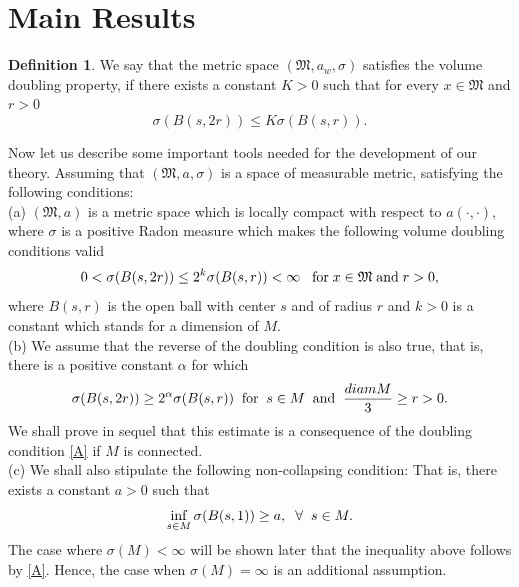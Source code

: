 \documentclass[10pt]{article}
\theoremstyle{definition}
\newtheorem{defx}[thm]{Definition}
\numberwithin{equation}{section}
\begin{document}
	\section{Main Results}
	\begin{defx}
		We say that the metric space $(\mathfrak{M},a_w,\sigma)$ satisfies the volume doubling property, if there exists a constant $K>0$ such that for every $x\in \mathfrak{M}$ and $r>0$ $$\sigma(B(s,2r))\leq K\sigma(B(s,r)).$$
	\end{defx}
	\noindent
	Now let us describe some important tools needed for the development of our theory. Assuming that $(\mathfrak{M},a,\sigma)$ is a space of measurable metric, satisfying the following conditions:\\
	(a) $ (\mathfrak{M},a) $ is a metric space which is locally compact with respect to $ a(\cdotp, \cdotp),$  where $\sigma$ is a positive Radon measure which makes the following volume doubling conditions valid\\
	\begin{equation}\label{A}
		0 < \sigma (B(s,2r)) \leq 2^k \sigma (B(s,r)) < \infty \hspace{0.2 cm}\;\mbox{for}\; x \in \mathfrak{M}\;  \mbox{and}\;  r >0,
	\end{equation}
	where $B(s,r)$ is the open ball with center $s$ and of radius $r$ and $k >0$ is a constant which stands for a dimension of $M$.\\
	(b) We assume that the reverse of the doubling condition is also true, that is, there is a positive constant $ \alpha$ for which
	\begin{equation}\label{F}
		\sigma (B(s,2r)) \geq 2^{\alpha} \sigma (B(s,r)) \;\; \hbox{for}\; \; s \in M \;\; \hbox{and}\; \; \frac{diam M}{3} \geq r >0.
	\end{equation}
	We shall prove in sequel that this estimate is a consequence of the doubling condition \eqref{A} if $M$ is connected.\\
	(c) We shall also stipulate the following non-collapsing condition: That is, there exists a constant $a >0$ such that
	\begin{equation}\label{G}
		\inf_{s \in M} \sigma (B(s,1)) \geq a, \hspace{0.2 cm} \forall \hspace{0.2 cm} s \in M.
	\end{equation}
	The case where $ \sigma (M) < \infty $ will be shown later that the inequality above follows by \eqref{A}. Hence, the case when  $ \sigma (M) = \infty $ is an additional assumption.\\
\end{document}
